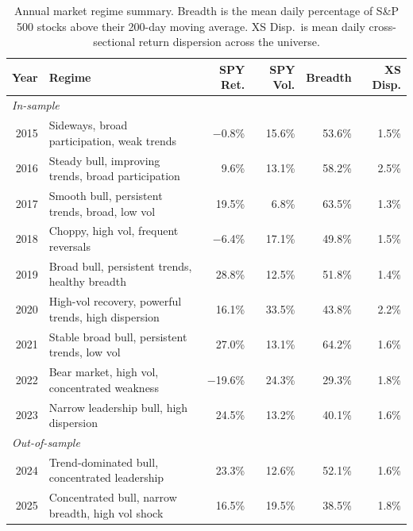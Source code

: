 \documentclass{article}
\begin{document}
\begin{table}[htbp]
\centering
\small
\begin{tabular}{rp{5.5cm}rrrr}
\toprule
Year & Regime & SPY Ret. & SPY Vol. & Breadth & XS Disp. \\
\midrule
\multicolumn{6}{l}{\textit{In-sample}} \\
2015 & Sideways, broad participation, weak trends         &  $-$0.8\% & 15.6\% & 53.6\% & 1.5\% \\
2016 & Steady bull, improving trends, broad participation &    9.6\%  & 13.1\% & 58.2\% & 2.5\% \\
2017 & Smooth bull, persistent trends, broad, low vol     &   19.5\%  &  6.8\% & 63.5\% & 1.3\% \\
2018 & Choppy, high vol, frequent reversals               &  $-$6.4\% & 17.1\% & 49.8\% & 1.5\% \\
2019 & Broad bull, persistent trends, healthy breadth     &   28.8\%  & 12.5\% & 51.8\% & 1.4\% \\
2020 & High-vol recovery, powerful trends, high dispersion &  16.1\%  & 33.5\% & 43.8\% & 2.2\% \\
2021 & Stable broad bull, persistent trends, low vol      &   27.0\%  & 13.1\% & 64.2\% & 1.6\% \\
2022 & Bear market, high vol, concentrated weakness       & $-$19.6\% & 24.3\% & 29.3\% & 1.8\% \\
2023 & Narrow leadership bull, high dispersion            &   24.5\%  & 13.2\% & 40.1\% & 1.6\% \\
\midrule
\multicolumn{6}{l}{\textit{Out-of-sample}} \\
2024 & Trend-dominated bull, concentrated leadership      &   23.3\%  & 12.6\% & 52.1\% & 1.6\% \\
2025 & Concentrated bull, narrow breadth, high vol shock  &   16.5\%  & 19.5\% & 38.5\% & 1.8\% \\
\bottomrule
\end{tabular}
\caption{Annual market regime summary. Breadth is the mean daily percentage of S\&P 500 stocks above their 200-day moving average. XS Disp.\ is mean daily cross-sectional return dispersion across the universe.}
\label{tab:regimes}
\end{table}
\end{document}
